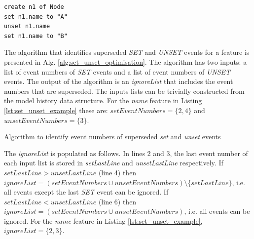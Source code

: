 \documentclass[12pt, a4paper]{report} \usepackage[titletoc]{appendix}
\begin{document}
\begin{lstlisting}[style=eol,caption={The CBP representation of attribute \emph{name} assignments.},label=lst:set_unset_example]
create n1 of Node
set n1.name to "A"
unset n1.name
set n1.name to "B"
\end{lstlisting}

The algorithm that identifies superseded \emph{SET} and \emph{UNSET} events for a feature is presented in Alg. \ref{alg:set_unset_optimisation}. The algorithm has two inputs: a list of event numbers of \emph{SET} events and a list of event numbers of \emph{UNSET} events. The output of the algorithm is an \emph{ignoreList} that includes the event numbers that are superseded. The inputs lists can be trivially constructed from the model history data structure. For the \emph{name} feature in Listing \ref{lst:set_unset_example} these are: $setEventNumbers = \{2,4\}$ and $unsetEventNumbers = \{3\}$.

\begin{algorithm}[H]
	\begin{small}
	\end{small}
	\caption{Algorithm to identify event numbers of superseded \emph{set} and \emph{unset} events}
	\label{alg:set_unset_optimisation}
\end{algorithm}

The \emph{ignoreList} is populated as follows.
In lines 2 and 3, the last event number of each input list is stored in \emph{setLastLine} and \emph{unsetLastLine} respectively. If $setLastLine > unsetLastLine$ (line 4) then $ignoreList = (setEventNumbers \cup unsetEventNumbers) \setminus  \{setLastLine\} $, i.e. all events except the last \emph{SET} event can be ignored. If $setLastLine < unsetLastLine$ (line 6) then $ignoreList = (setEventNumbers \cup unsetEventNumbers)$, i.e. all events can be ignored. For the \emph{name} feature in Listing \ref{lst:set_unset_example}, $ignoreList = \{2, 3\}$.
\end{document}
